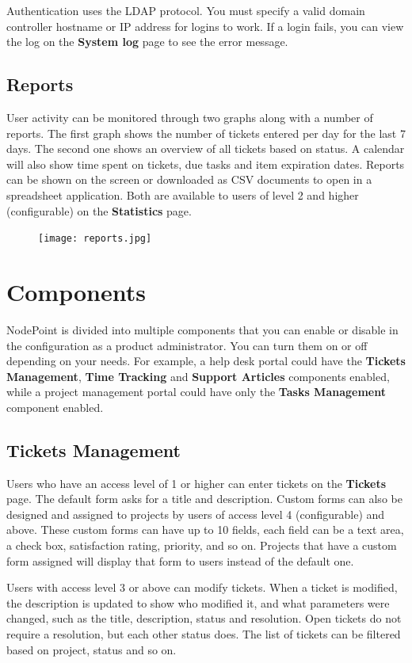 \documentclass[11pt]{article}
\begin{document}
Authentication uses the LDAP protocol. You must specify a valid domain controller hostname or IP address for logins to work. If a login fails, you can view the log on the \textbf{System log} page to see the error message.

\subsection{Reports}
User activity can be monitored through two graphs along with a number of reports. The first graph shows the number of tickets entered per day for the last 7 days. The second one shows an overview of all tickets based on status. A calendar will also show time spent on tickets, due tasks and item expiration dates. Reports can be shown on the screen or downloaded as CSV documents to open in a spreadsheet application. Both are available to users of level 2 and higher (configurable) on the \textbf{Statistics} page.

\begin{figure}[h]
\texttt{[image: reports.jpg]}
\end{figure}

\clearpage
\section{Components}
NodePoint is divided into multiple components that you can enable or disable in the configuration as a product administrator. You can turn them on or off depending on your needs. For example, a help desk portal could have the \textbf{Tickets Management}, \textbf{Time Tracking} and \textbf{Support Articles} components enabled, while a project management portal could have only the \textbf{Tasks Management} component enabled.

\subsection{Tickets Management}
Users who have an access level of 1 or higher can enter tickets on the \textbf{Tickets} page. The default form asks for a title and description. Custom forms can also be designed and assigned to projects by users of access level 4 (configurable) and above. These custom forms can have up to 10 fields, each field can be a text area, a check box, satisfaction rating, priority, and so on. Projects that have a custom form assigned will display that form to users instead of the default one.

Users with access level 3 or above can modify tickets. When a ticket is modified, the description is updated to show who modified it, and what parameters were changed, such as the title, description, status and resolution. Open tickets do not require a resolution, but each other status does. The list of tickets can be filtered based on project, status and so on.
\end{document}
